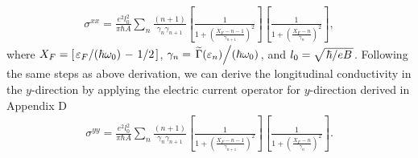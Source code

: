 \documentclass{article}
\begin{document}
\begin{itemize}
{\begin{equation}
\begin{aligned}
      \sigma^{xx}  =
      \frac{e^2l_0^2}{\pi\hbar A}
      \sum_{n}
      \frac{(n+1)}{\gamma_{n}\gamma_{n+1}}
      \left[
        \frac{1}
        {
          1 + \left(\frac{X_F - n -1}{\gamma_{n+1}}\right)^2
        }
      \right]
      \left[
        \frac{1}
        {
          1 + \left(\frac{X_F - n}{\gamma_{n}}\right)^2
        }
      \right],
    \end{aligned}
  \end{equation}
  where $X_F = \left[\flatfrac{\varepsilon_F}{(\hbar \omega_0)} - \flatfrac{1}{2}\right]$,
  $\gamma_n = \flatfrac{\widetilde{{\Gamma}}(\varepsilon_n)}{(\hbar \omega_0)}$, and $l_0 = \sqrt{\flatfrac{\hbar}{eB}}$.
  Following the same steps as above derivation, we can derive the longitudinal conductivity in the $y$-direction by applying the electric current operator for $y$-direction derived in Appendix D
  \begin{equation} \label{eq:36}
    \begin{aligned}
      {\sigma}^{yy} =
      \frac{e^2l_0^2}{\pi\hbar A}
      \sum_{n}
      \frac{(n+1)}{\gamma_{n}\gamma_{n+1}}
      \left[
        \frac{1}
        {
          1 + \left(\frac{X_F - n -1}{\gamma_{n+1}}\right)^2
        }
      \right]
      \left[
        \frac{1}
        {
          1 + \left(\frac{X_F - n}{\gamma_{n}}\right)^2
        }
      \right].
    \end{aligned}
  \end{equation}
  }
\end{itemize}
\end{document}
